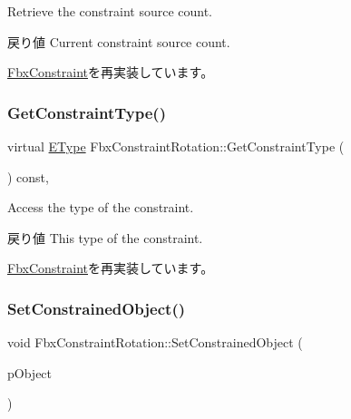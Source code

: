 Retrieve the constraint source count. \begin{DoxyReturn}{戻り値}
Current constraint source count. 
\end{DoxyReturn}


\hyperlink{class_fbx_constraint_aa702f86c6a1832ce3b4905911e66c58f}{Fbx\+Constraint}を再実装しています。

\mbox{\label{class_fbx_constraint_rotation_a8d9f54ac347d18a0871eafc21e88cb77}} 
\subsubsection{\texorpdfstring{Get\+Constraint\+Type()}{GetConstraintType()}}
{\footnotesize\ttfamily virtual \hyperlink{class_fbx_constraint_a49c1634663395eab7c28856df233ec66}{E\+Type} Fbx\+Constraint\+Rotation\+::\+Get\+Constraint\+Type (\begin{DoxyParamCaption}{ }\end{DoxyParamCaption}) const\hspace{0.3cm}{\ttfamily [protected]}, {\ttfamily [virtual]}}

Access the type of the constraint. \begin{DoxyReturn}{戻り値}
This type of the constraint. 
\end{DoxyReturn}


\hyperlink{class_fbx_constraint_adbeea66a1a605531a019aa6df90dc45b}{Fbx\+Constraint}を再実装しています。

\mbox{\label{class_fbx_constraint_rotation_ae7d40f146877a4defd18cd41692fa78e}} 
\subsubsection{\texorpdfstring{Set\+Constrained\+Object()}{SetConstrainedObject()}}
{\footnotesize\ttfamily void Fbx\+Constraint\+Rotation\+::\+Set\+Constrained\+Object (\begin{DoxyParamCaption}\item[{\hyperlink{class_fbx_object}{Fbx\+Object} $\ast$}]{p\+Object }\end{DoxyParamCaption})}

